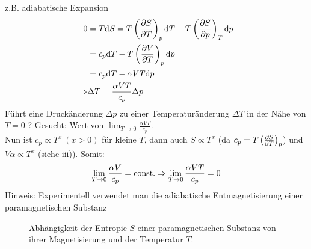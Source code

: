 \begin{enumerate}[i)]
    z.B. adiabatische Expansion
    \begin{equation}
        \begin{split}
            0 &= T \mathrm{d} S = T \left( \frac{\partial S}{\partial T} \right)_{p} \mathrm{d} T + T \left( \frac{\partial S}{\partial p} \right)_{T} \mathrm{d} p \\
            &= c_p \mathrm{d} T - T \left( \frac{\partial V}{\partial T} \right)_{p} \mathrm{d} p \\
            &= c_p \mathrm{d} T - \alpha V T \mathrm{d} p \\
            \Rightarrow & \Delta T = \frac{\alpha V T}{c_p} \Delta p
        \end{split}
    \end{equation}
    Führt eine Druckänderung $\Delta p$ zu einer Temperaturänderung $\Delta T$ in der Nähe von $T=0$ ?
    Gesucht: Wert von $\lim_{T \to 0} \frac{\alpha V T}{c_p}$.\\
    Nun ist $c_p \propto T^x \ (x > 0)$ für kleine $T$, dann auch $S \propto T^x$ (da $c_p = T \left( \frac{\partial S}{\partial T} \right)_{p}$) und
    $V \alpha \propto T^x$ (siehe iii)). Somit:
    \begin{equation}
        \lim_{T \to 0} \frac{\alpha V}{c_p} = \text{const.} \Rightarrow \lim_{T \to 0}  \frac{\alpha V T}{c_p} = 0
    \end{equation}
    Hinweis: Experimentell verwendet man die adiabatische Entmagnetisierung einer paramagnetischen Substanz
    
    \begin{figure}[H]
        \centering
        \def\svgwidth{0.5\textwidth}
        
        \caption{Abhängigkeit der Entropie $S$ einer paramagnetischen Substanz von
        ihrer Magnetisierung und der Temperatur $T$.}
        \label{img:paramag_Tto0}
    \end{figure}
    

\end{enumerate}
